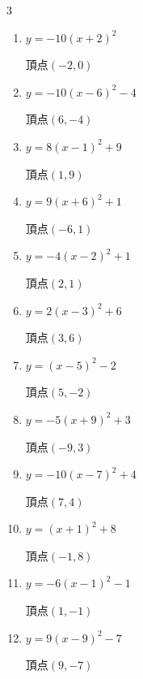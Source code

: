 \begin{multicols}{3}
\begin{enumerate}
  \item $\displaystyle y=-10\left( x+2\right)^{2}$

        $\displaystyle 頂点\left( -2 , 0 \right)$

  \item $\displaystyle y=-10\left( x-6\right)^{2}-4$

        $\displaystyle 頂点\left( 6 , -4 \right)$

  \item $\displaystyle y=8\left( x-1\right)^{2}+9$

        $\displaystyle 頂点\left( 1 , 9 \right)$

  \item $\displaystyle y=9\left( x+6\right)^{2}+1$

        $\displaystyle 頂点\left( -6 , 1 \right)$

  \item $\displaystyle y=-4\left( x-2\right)^{2}+1$

        $\displaystyle 頂点\left( 2 , 1 \right)$

  \item $\displaystyle y=2\left( x-3\right)^{2}+6$

        $\displaystyle 頂点\left( 3 , 6 \right)$

  \item $\displaystyle y=\left( x-5\right)^{2}-2$

        $\displaystyle 頂点\left( 5 , -2 \right)$

  \item $\displaystyle y=-5\left( x+9\right)^{2}+3$

        $\displaystyle 頂点\left( -9 , 3 \right)$

  \item $\displaystyle y=-10\left( x-7\right)^{2}+4$

        $\displaystyle 頂点\left( 7 , 4 \right)$

  \item $\displaystyle y=\left( x+1\right)^{2}+8$

        $\displaystyle 頂点\left( -1 , 8 \right)$

  \item $\displaystyle y=-6\left( x-1\right)^{2}-1$

        $\displaystyle 頂点\left( 1 , -1 \right)$

  \item $\displaystyle y=9\left( x-9\right)^{2}-7$

        $\displaystyle 頂点\left( 9 , -7 \right)$


\end{enumerate}
\end{multicols}
